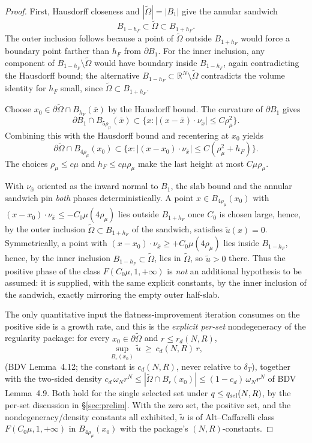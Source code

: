 \documentclass[11pt]{amsart}
\theoremstyle{definition}
\newcommand{\R}{\mathbb R}
\newcommand{\abs}[1]{\left|#1\right|}
\begin{document}
\begin{proof}
First, Hausdorff closeness and $\abs{\widetilde\Omega}=\abs{B_1}$ give the
annular sandwich
\[
B_{1-h_F}\subset\widetilde\Omega\subset B_{1+h_F}.
\]
The outer inclusion follows because a point of $\widetilde\Omega$ outside
$B_{1+h_F}$ would force a boundary point farther than $h_F$ from $\partial B_1$.
For the inner inclusion, any component of
$B_{1-h_F}\setminus\widetilde\Omega$ would have boundary inside $B_{1-h_F}$,
again contradicting the Hausdorff bound; the alternative
$B_{1-h_F}\subset\R^N\setminus\widetilde\Omega$ contradicts the volume identity
for $h_F$ small, since $\widetilde\Omega\subset B_{1+h_F}$.

Choose $x_0\in\partial\widetilde\Omega\cap B_{h_F}(\bar x)$ by the
Hausdorff bound. The curvature of $\partial B_1$ gives
\[
\partial B_1\cap B_{5\rho_\mu}(\bar x)\subset
\{x:\abs{(x-\bar x)\cdot\nu_{\bar x}}\le C\rho_\mu^2\}.
\]
Combining this with the Hausdorff bound and recentering at $x_0$ yields
\[
\partial\widetilde\Omega\cap B_{4\rho_\mu}(x_0)
\subset
\{x:\abs{(x-x_0)\cdot\nu_{\bar x}}\le C(\rho_\mu^2+h_F)\}.
\]
The choices $\rho_\mu\le c\mu$ and $h_F\le c\mu\rho_\mu$ make the last height
at most $C\mu\rho_\mu$.

With $\nu_{\bar x}$ oriented as the inward normal to $B_1$, the slab bound and
the annular sandwich pin \emph{both} phases deterministically. A point
$x\in B_{4\rho_\mu}(x_0)$ with
$(x-x_0)\cdot\nu_{\bar x}\le -C_0\mu(4\rho_\mu)$ lies outside $B_{1+h_F}$ once
$C_0$ is chosen large, hence, by the outer inclusion
$\widetilde\Omega\subset B_{1+h_F}$ of the sandwich, satisfies
$\widetilde u(x)=0$. Symmetrically, a point with
$(x-x_0)\cdot\nu_{\bar x}\ge +C_0\mu(4\rho_\mu)$ lies inside $B_{1-h_F}$, hence,
by the inner inclusion $B_{1-h_F}\subset\widetilde\Omega$, lies in
$\widetilde\Omega$, so $\widetilde u>0$ there. Thus the positive phase of the
class $F(C_0\mu,1,+\infty)$ is \emph{not} an additional hypothesis to be
assumed: it is supplied, with the same explicit constants, by the inner
inclusion of the sandwich, exactly mirroring the empty outer half-slab.

The only quantitative input the flatness-improvement iteration consumes on the
positive side is a growth rate, and this is the \emph{explicit per-set}
nondegeneracy of the regularity package: for every $x_0\in\partial\widetilde
\Omega$ and $r\le r_d(N,R)$,
\[
\sup_{B_r(x_0)}\widetilde u\ \ge\ c_d(N,R)\,r ,
\]
(BDV Lemma~4.12; the constant is $c_d(N,R)$, never relative to $\delta_T$),
together with the two-sided density $c_d\,\omega_N r^{N}\le
\abs{\widetilde\Omega\cap B_r(x_0)}\le(1-c_d)\,\omega_N r^{N}$ of BDV
Lemma~4.9. Both hold for the single selected set under
$q\le q_{\rm sel}(N,R)$, by the per-set discussion in
\S\ref{sec:prelim}. With the zero set, the positive set, and the
nondegeneracy/density constants all exhibited, $\widetilde u$ is of
Alt--Caffarelli class $F(C_0\mu,1,+\infty)$ in $B_{4\rho_\mu}(x_0)$ with the
package's $(N,R)$-constants.
\end{proof}
\end{document}
